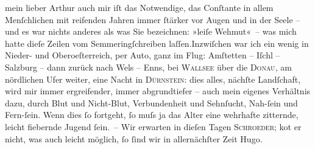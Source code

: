 \pstart{}mein lieber Arthur \pend\vspace{0.5em}
\pstart
           auch mir iſt das Notwendige, das Conſtante in allem Menſchlichen mit reifenden Jahren
               immer ſtärker vor Augen und in der Seele – und es war nichts anderes als was Sie
               bezeichnen: »leiſe Wehmut« – was mich hatte dieſe Zeilen vom Semmeringſchreiben laſſen.\hspace*{1.5em}Inzwiſchen war ich ein wenig in Nieder- und
                  Oberoeſterreich, {\pb}per Auto, ganz im Flug: Amſtetten – Iſchl – Salzburg – dann zurück nach Wels – Enns, bei \textsc{Wallsee} über die \textsc{Donau}, am nördlichen Ufer weiter, eine Nacht in \textsc{Dürnstein}: dies alles, nächſte Landſchaft, wird mir immer ergreifender, immer
               abgrundtiefer – auch mein eigenes Verhältnis dazu, durch Blut und Nicht-Blut,
               Verbundenheit und Sehnſucht, Nah-ſein und Fern-ſein. Wenn dies ſo fortgeht, ſo muſs
               ja das Alter eine wehrhafte zitternde, leicht fiebernde Jugend ſein. – Wir erwarten
               in dieſen Tagen \textsc{Schroeder}; ko{\geminationm}t er nicht, was auch leicht möglich, ſo ſind
               wir in allernächſter Zeit \label{T_L02176-1v}\label{T_L02176-1}\pend
           \pstart \spacefill\mbox{Hugo.}\pend{}\endnumbering{}  
      